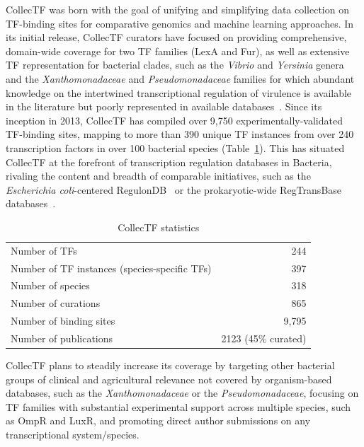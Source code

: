 CollecTF was born with the goal of unifying and simplifying data collection on
TF-binding sites for comparative genomics and machine learning approaches. In
its initial release, CollecTF curators have focused on providing comprehensive,
domain-wide coverage for two TF families (LexA and Fur), as well as extensive
TF representation for bacterial clades, such as the \textit{Vibrio} and
\textit{Yersinia} genera and the \textit{Xanthomonadaceae} and
\textit{Pseudomonadaceae} families for which
abundant knowledge on the intertwined transcriptional regulation of virulence
is available in the literature but poorly represented in available
databases~\cite{matson2007regulatory}. Since its inception in 2013, CollecTF
has compiled over 9,750 experimentally-validated TF-binding sites, mapping to
more than 390 unique TF instances from over 240 transcription factors in over
100 bacterial species (Table~\ref{tab:collectf-stats}). This has situated
CollecTF at the forefront of transcription regulation databases in Bacteria,
rivaling the content and breadth of comparable initiatives, such as the
\textit{Escherichia coli}-centered RegulonDB~\cite{salgado2013regulondb} or the
prokaryotic-wide RegTransBase databases~\cite{kazakov2007regtransbase}.

\begin{table}
  \centering
  \caption{CollecTF statistics}
  \begin{tabular}{l r}
    \toprule
    Number of TFs & 244\\
    Number of TF instances (species-specific TFs) & 397\\
    Number of species & 318\\
    Number of curations & 865\\
    Number of binding sites & 9,795\\
    Number of publications & 2123 (45\% curated)\\
    \bottomrule
  \end{tabular}
  \label{tab:collectf-stats}
\end{table}

CollecTF plans to steadily increase its coverage by targeting other bacterial
groups of clinical and agricultural relevance not covered by organism-based
databases, such as the \textit{Xanthomonadaceae} or the
\textit{Pseudomonadaceae}, focusing on TF families with substantial
experimental support across multiple species, such as OmpR and LuxR, and
promoting direct author submissions on any transcriptional system/species.

